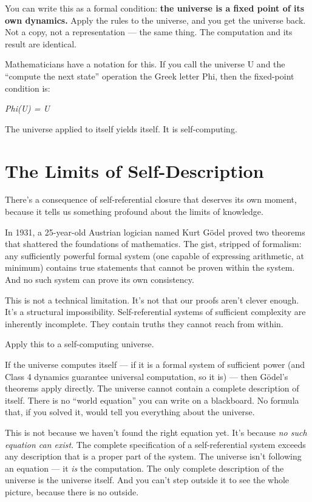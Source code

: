 \documentclass[11pt, twoside, openright]{book}
\begin{document}
You can write this as a formal condition: \textbf{the universe is a fixed point of its own dynamics.} Apply the rules to the universe, and you get the universe back. Not a copy, not a representation --- the same thing. The computation and its result are identical.

Mathematicians have a notation for this. If you call the universe U and the ``compute the next state'' operation the Greek letter Phi, then the fixed-point condition is:

\textit{Phi(U) = U}

The universe applied to itself yields itself. It is self-computing.


\section*{The Limits of Self-Description}

There's a consequence of self-referential closure that deserves its own moment, because it tells us something profound about the limits of knowledge.

In 1931, a 25-year-old Austrian logician named Kurt Gödel proved two theorems that shattered the foundations of mathematics. The gist, stripped of formalism: any sufficiently powerful formal system (one capable of expressing arithmetic, at minimum) contains true statements that cannot be proven within the system. And no such system can prove its own consistency.

This is not a technical limitation. It's not that our proofs aren't clever enough. It's a structural impossibility. Self-referential systems of sufficient complexity are inherently incomplete. They contain truths they cannot reach from within.

Apply this to a self-computing universe.

If the universe computes itself --- if it is a formal system of sufficient power (and Class 4 dynamics guarantee universal computation, so it is) --- then Gödel's theorems apply directly. The universe cannot contain a complete description of itself. There is no ``world equation'' you can write on a blackboard. No formula that, if you solved it, would tell you everything about the universe.

This is not because we haven't found the right equation yet. It's because \textit{no such equation can exist}. The complete specification of a self-referential system exceeds any description that is a proper part of the system. The universe isn't following an equation --- it \textit{is} the computation. The only complete description of the universe is the universe itself. And you can't step outside it to see the whole picture, because there is no outside.
\end{document}
